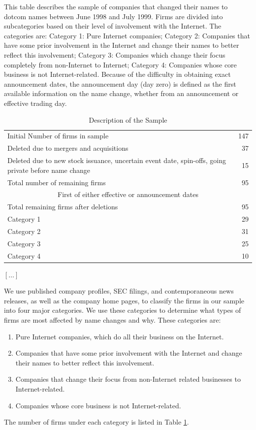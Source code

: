 \documentclass[12pt,a4paper]{article}
\begin{document}
\begin{table}[h]
\caption{Description of the Sample}
\label{tab:sample}
\scriptsize This table describes the sample of companies that changed their names to dotcom names between June 1998 and July 1999. Firms are divided into subcategories based on their level of involvement with the Internet. The categories are: Category 1: Pure Internet companies; Category 2: Companies that have some prior involvement in the Internet and change their names to better reflect this involvement; Category 3: Companies which change their focus completely from non-Internet to Internet; Category 4: Companies whose core business is not Internet-related. Because of the difficulty in obtaining exact announcement dates, the announcement day (day zero) is defined as the first available information on the name change, whether from an announcement or effective trading day.

\medskip
\centering \begin{tabular}{p{10cm}r}
\hline
Initial Number of firms in sample &	147 \\
Deleted due to mergers and acquisitions & 37 \\
Deleted due to new stock issuance, uncertain event date, spin-offs, going private before name change & 15 \\
Total number of remaining firms & 95 \\
\hline
\multicolumn{2}{c}{First of either effective or announcement dates} \\
Total remaining firms after deletions & 95 \\
\hline
Category 1 & 29 \\
Category 2 & 31 \\
Category 3 & 25 \\
Category 4 & 10 \\
\hline
\end{tabular}
\end{table}

$[\ldots]$

We use published company profiles, SEC filings, and contemporaneous news releases, as well as the company home pages, to classify the firms in our sample into four major categories. We use these categories to determine what types of firms are most affected by name changes and why. These categories are: 
\begin{enumerate}
\item Pure Internet companies, which do all their business on the Internet.
\item Companies that have some prior involvement with the Internet and change their names to better reflect this involvement.
\item Companies that change their focus from non-Internet related businesses to Internet-related. 
\item Companies whose core business is not Internet-related.
\end{enumerate}
The number of firms under each category is listed in Table \ref{tab:sample}.
\end{document}
